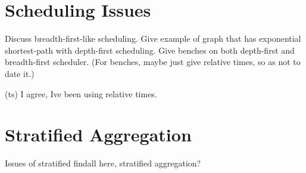 \section{Scheduling Issues}

Discuss breadth-first-like scheduling.  Give example of graph that has
exponential shortest-path with depth-first scheduling.  Give benches
on both depth-first and breadth-first scheduler.  (For benches, maybe
just give relative times, so as not to date it.)

(ts) I agree, Ive been using relative times.

\section{Stratified Aggregation}

Issues of stratified findall here, stratified aggregation?

